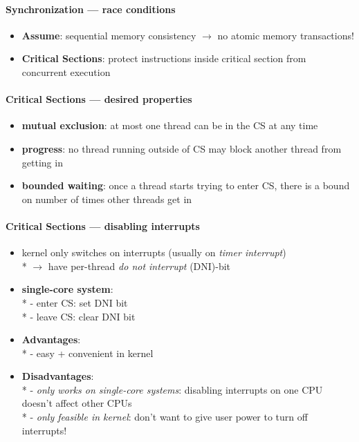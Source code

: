 \paragraph{Synchronization --- race conditions}
\begin{itemize}
  \item \textbf{Assume}: sequential memory consistency \( \to \) no atomic memory transactions!
  \item \textbf{Critical Sections}: protect instructions inside critical section from concurrent execution
\end{itemize}

\paragraph{Critical Sections --- desired properties}
\begin{itemize}
  \item \textbf{mutual exclusion}: at most one thread can be in the CS at any time
  \item \textbf{progress}: no thread running outside of CS may block another thread from getting in
  \item \textbf{bounded waiting}: once a thread starts trying to enter CS, there is a bound on number of times other threads get in
\end{itemize}

\paragraph{Critical Sections --- disabling interrupts}
\begin{itemize}
  \item kernel only switches on interrupts (usually on \emph{timer interrupt}) \\*
    \( \to \) have per-thread \emph{do not interrupt} (DNI)-bit
  \item \textbf{single-core system}: \\*
    - enter CS: set DNI bit \\*
    - leave CS: clear DNI bit
  \item \textbf{Advantages}: \\*
    - easy + convenient in kernel
  \item \textbf{Disadvantages}: \\*
    - \emph{only works on single-core systems}: disabling interrupts on one CPU doesn't affect other CPUs \\*
    - \emph{only feasible in kernel}: don't want to give user power to turn off interrupts!
\end{itemize}

